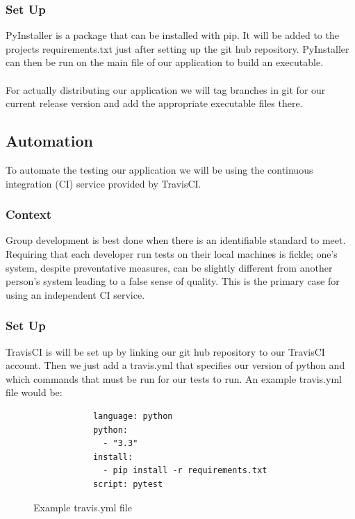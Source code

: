\documentclass[onecolumn, draftclsnofoot,10pt, compsoc]{IEEEtran}
\begin{document}
\subsubsection{Set Up}

PyInstaller is a package that can be installed with pip. It will be added to the projects requirements.txt just after setting up the git hub repository. PyInstaller can then be run on the main file of our application to build an executable.
\\\\
\noindent
For actually distributing our application we will tag branches in git for our current release version and add the appropriate executable files there. 
\subsection{Automation}

To automate the testing our application we will be using the continuous integration (CI) service provided by TravisCI.

\subsubsection{Context}

Group development is best done when there is an identifiable standard to meet. Requiring that each developer run tests on their local machines is fickle; one's system, despite preventative measures, can be slightly different from another person's system leading to a false sense of quality. This is the primary case for using an independent CI service.    

\subsubsection{Set Up}
 
 TravisCI is will be set up by linking our git hub repository to our TravisCI account. Then we just add a travis.yml that specifies our version of python and which commands that must be run for our tests to run. An example travis.yml file would be:
 
 \begin{figure}[H]
     \centering
	 \begin{lstlisting}
            language: python
            python:
              - "3.3"
            install:
              - pip install -r requirements.txt
            script: pytest
        \end{lstlisting}
     \caption{Example travis.yml file}
     \label{fig:travis-ci}
 \end{figure}{}
\end{document}
